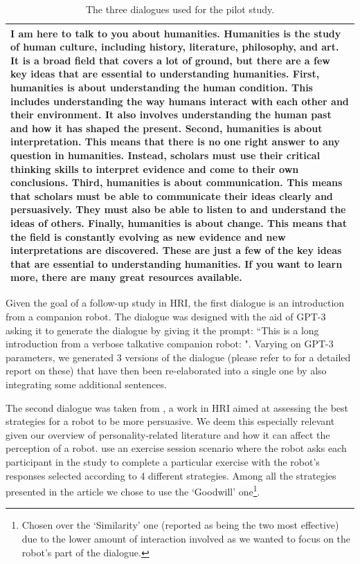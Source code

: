 \documentclass[nomenclature, english, biblatex]{kththesis}
\begin{document}
\begin{table}
\begin{adjustbox}{max width=\textwidth}
\begin{tabular}{|p{\textwidth}|}
        I am here to talk to you about humanities. Humanities is the study of human culture, including history, literature, philosophy, and art. It is a broad field that covers a lot of ground, but there are a few key ideas that are essential to understanding humanities. First, humanities is about understanding the human condition. This includes understanding the way humans interact with each other and their environment. It also involves understanding the human past and how it has shaped the present. Second, humanities is about interpretation. This means that there is no one right answer to any question in humanities. Instead, scholars must use their critical thinking skills to interpret evidence and come to their own conclusions. Third, humanities is about communication. This means that scholars must be able to communicate their ideas clearly and persuasively. They must also be able to listen to and understand the ideas of others. Finally, humanities is about change. This means that the field is constantly evolving as new evidence and new interpretations are discovered. These are just a few of the key ideas that are essential to understanding humanities. If you want to learn more, there are many great resources available.\\
        \hline
        \end{tabular}
    \end{adjustbox}
    \caption{The three dialogues used for the pilot study.}
    \label{tab:dialogues}
\end{table}
Given the goal of a follow-up study in \gls{HRI}, the first dialogue is an introduction from a companion robot. The dialogue was designed with the aid of GPT-3 asking it to generate the dialogue by giving it the prompt: ``This is a long introduction from a verbose talkative companion robot: ". Varying on GPT-3 parameters, we generated 3 versions of the dialogue (please refer to  for a detailed report on these) that have then been re-elaborated into a single one by also integrating some additional sentences.

The second dialogue was taken from \cite{winkle2019effective}, a work in \gls{HRI} aimed at assessing the best strategies for a robot to be more persuasive. We deem this especially relevant given our overview of personality-related literature and how it can affect the perception of a robot. \textcite{winkle2019effective} use an exercise session scenario where the robot asks each participant in the study to complete a particular exercise with the robot's responses selected according to 4 different strategies. Among all the strategies presented in the article we chose to use the `Goodwill' one\footnote{Chosen over the `Similarity' one (reported as being the two most effective) due to the lower amount of interaction involved as we wanted to focus on the robot's part of the dialogue.}.
\end{document}
